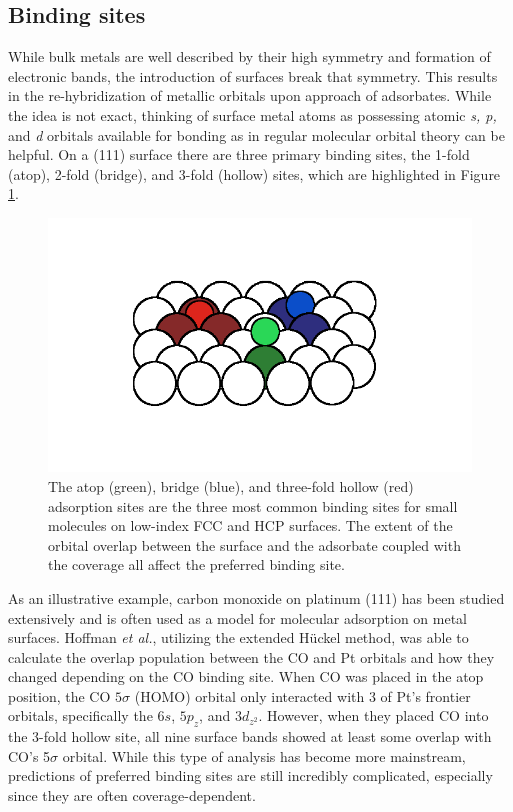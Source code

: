 \subsection{Binding sites}
While bulk metals are well described by their high symmetry and formation of
electronic bands, the introduction of surfaces break that symmetry. This results in the re-hybridization of
metallic orbitals upon approach of adsorbates. While the idea is not
exact, thinking of surface metal atoms as possessing atomic {\em s, p, } and {\em d}
orbitals available for bonding as in regular molecular orbital theory can be
helpful. On a (111) surface there are three primary binding sites, the 1-fold
(atop), 2-fold (bridge), and 3-fold (hollow) sites, which are highlighted in
Figure \ref{fig:binding}. 

\begin{figure}[p!]
  \includegraphics[width=\linewidth]{../figures/chap1/binding.pdf}
  \caption{The atop (green), bridge (blue), and three-fold hollow (red)
adsorption sites are the three most common binding sites for small molecules on
low-index FCC and HCP surfaces. The extent of the orbital overlap between the surface and the adsorbate coupled with the coverage all affect the preferred binding site.}
\label{fig:binding}
\end{figure}

As an illustrative example, carbon monoxide on platinum (111) has been studied
extensively\citep{Ertl:1977cg, Kelemen:1979ad, Yeo:1997th, Wong:1991ta, Feibelman:2001qa, Deshlahra:2009wu,
Deshlahra:2012aa} and is often used as a model for molecular adsorption on
metal surfaces.  Hoffman {\em et al.}, utilizing the extended H\"uckel
method,\citep{Wong:1991ta} was able to calculate the overlap population between
the CO and Pt orbitals and how they changed depending on the CO  binding site.
When CO was placed in the atop
position, the CO $5\sigma$ (HOMO) orbital only interacted with 3 of Pt's frontier
orbitals, specifically the $6s$, $5p_z$, and
$3d_{z^2}$. However, when they placed CO into the
3-fold hollow site, all nine surface bands showed at least some overlap with
CO's 5$\sigma$ orbital. While this type of analysis has become more mainstream,
predictions of preferred binding sites are still incredibly complicated,
especially since they are often coverage-dependent.

